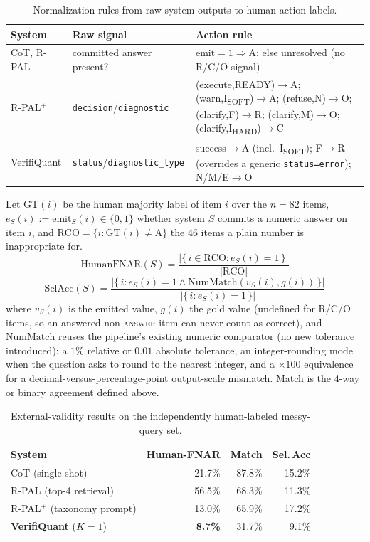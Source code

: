 \documentclass[sigconf,anonymous]{acmart}
\begin{document}
\begin{table}[t]
\caption{Normalization rules from raw system outputs to human action labels.}
\label{tab:v2extmap}
\footnotesize
\begin{tabular}{@{}lll@{}}
\toprule
System & Raw signal & Action rule \\
\midrule
CoT, R-PAL & committed answer present? & $\mathrm{emit}{=}1\Rightarrow$A; else unresolved (no R/C/O signal) \\
R-PAL$^{+}$ & \texttt{decision}/\texttt{diagnostic} & (execute,READY)$\to$A; (warn,I\textsubscript{SOFT})$\to$A; (refuse,N)$\to$O; (clarify,F)$\to$R; (clarify,M)$\to$O; (clarify,I\textsubscript{HARD})$\to$C \\
VerifiQuant & \texttt{status}/\texttt{diagnostic\_type} & success$\to$A (incl.\ I\textsubscript{SOFT}); F$\to$R (overrides a generic \texttt{status=error}); N/M/E$\to$O \\
\bottomrule
\end{tabular}
\end{table}

Let $\mathrm{GT}(i)$ be the human majority label of item $i$ over the $n{=}82$ items, $e_S(i){:=}\mathrm{emit}_S(i){\in}\{0,1\}$ whether system $S$ commits a numeric answer on item $i$, and $\mathrm{RCO}=\{i : \mathrm{GT}(i)\neq\text{A}\}$ the $46$ items a plain number is inappropriate for.
\[
\mathrm{HumanFNAR}(S) = \frac{|\{\, i \in \mathrm{RCO} : e_S(i){=}1 \,\}|}{|\mathrm{RCO}|}
\]
\[
\mathrm{SelAcc}(S) = \frac{|\{\, i : e_S(i){=}1 \wedge \mathrm{NumMatch}(v_S(i), g(i)) \,\}|}{|\{\, i : e_S(i){=}1 \,\}|}
\]
where $v_S(i)$ is the emitted value, $g(i)$ the gold value (undefined for R/C/O items, so an answered non-\textsc{answer} item can never count as correct), and $\mathrm{NumMatch}$ reuses the pipeline's existing numeric comparator (no new tolerance introduced): a $1\%$ relative or $0.01$ absolute tolerance, an integer-rounding mode when the question asks to round to the nearest integer, and a $\times100$ equivalence for a decimal-versus-percentage-point output-scale mismatch. Match is the 4-way or binary agreement defined above.

\begin{table}[t]
\caption{External-validity results on the independently human-labeled messy-query set.}
\label{tab:v2ext}
\small
\begin{tabular}{@{}lrrr@{}}
\toprule
System & Human-FNAR & Match & Sel.\,Acc \\
\midrule
CoT (single-shot) & 21.7\% & 87.8\% & 15.2\% \\
R-PAL (top-4 retrieval) & 56.5\% & 68.3\% & 11.3\% \\
R-PAL$^{+}$ (taxonomy prompt) & 13.0\% & 65.9\% & 17.2\% \\
\textbf{VerifiQuant} ($K{=}1$) & \textbf{8.7\%} & 31.7\% & 9.1\% \\
\bottomrule
\end{tabular}
\end{table}
\end{document}
